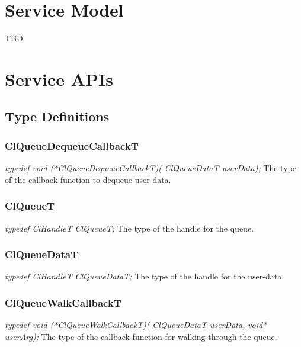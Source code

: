 \begin{flushleft}
\chapter{Service Model}
TBD


\chapter{Service APIs}


\section{Type Definitions}
\subsection{ClQueueDequeueCallbackT}
\textit{typedef void       (*ClQueueDequeueCallbackT)(}
\newline \textit{ClQueueDataT userData);}
\newline
\newline
The type of the callback function to dequeue user-data.


\subsection{ClQueueT}
\textit{typedef ClHandleT ClQueueT;}
\newline
\newline
 The type of the handle for the queue.

\subsection{ClQueueDataT}
\textit{typedef ClHandleT ClQueueDataT;}
\newline
\newline
 The type of the handle for the user-data.


\subsection{ClQueueWalkCallbackT}
\textit{typedef void       (*ClQueueWalkCallbackT)(}
\newline \textit{ClQueueDataT userData,}
\newline \textit{void* userArg);}
\newline
\newline
 The type of the callback function for walking through the queue.


\end{flushleft}
